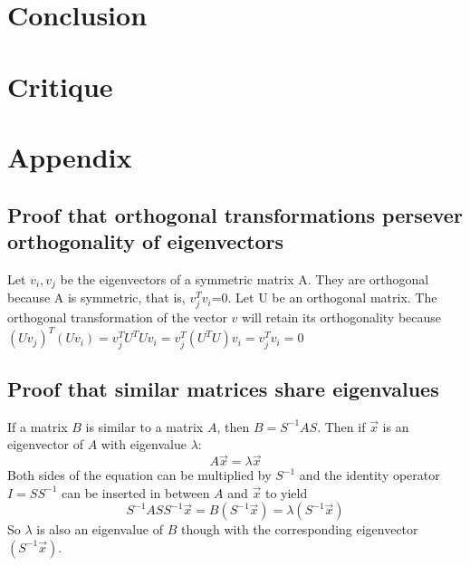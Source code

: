 \documentclass[10pt,a4paper]{article}
\begin{document}
\section{Conclusion}

\section{Critique}

\section{Appendix}
\subsection{Proof that orthogonal transformations persever orthogonality of eigenvectors}\label{eigenvector orthogonality}
Let $v_i, v_j$ be the eigenvectors of a symmetric matrix A. They are orthogonal because A is symmetric, that is, $v_{j}^Tv_i$=0. Let U be an orthogonal matrix. The orthogonal transformation of the vector $v$ will retain its orthogonality because
 $(Uv_j)^T(Uv_i)=v_{j}^TU^TUv_i=v_{j}^T(U^TU)v_i=v_{j}^Tv_i=0$
\subsection{Proof that similar matrices share eigenvalues}\label{proof of same eigenvalues}
If a matrix $B$ is similar to a matrix $A$, then $B=S^{-1}AS$. Then if $\vec{x}$ is an eigenvector of $A$ with eigenvalue $\lambda$:
$$
A\vec{x}=\lambda\vec{x}
$$
Both sides of the equation can be multiplied by $S^{-1}$ and the identity operator $I = SS^{-1}$ can be inserted in between $A$ and $\vec{x}$ to yield
$$
S^{-1}ASS^{-1}\vec{x} =B\left(S^{-1}\vec{x}\right)= \lambda \left( S^{-1}\vec{x}\right)
$$
So $\lambda$ is also an eigenvalue of $B$ though with the corresponding eigenvector $\left( S^{-1}\vec{x}\right)$.
\end{document}
